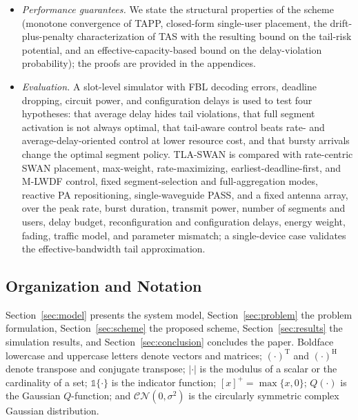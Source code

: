 \documentclass[journal]{IEEEtran}
\begin{document}
\begin{itemize}[leftmargin=*]
\item \emph{Performance guarantees.} We state the structural properties of the scheme (monotone convergence of TAPP, closed-form single-user placement, the drift-plus-penalty characterization of TAS with the resulting bound on the tail-risk potential, and an effective-capacity-based bound on the delay-violation probability); the proofs are provided in the appendices.
\item \emph{Evaluation.} A slot-level simulator with FBL decoding errors, deadline dropping, circuit power, and configuration delays is used to test four hypotheses: that average delay hides tail violations, that full segment activation is not always optimal, that tail-aware control beats rate- and average-delay-oriented control at lower resource cost, and that bursty arrivals change the optimal segment policy. TLA-SWAN is compared with rate-centric SWAN placement, max-weight, rate-maximizing, earliest-deadline-first, and M-LWDF control, fixed segment-selection and full-aggregation modes, reactive PA repositioning, single-waveguide PASS, and a fixed antenna array, over the peak rate, burst duration, transmit power, number of segments and users, delay budget, reconfiguration and configuration delays, energy weight, fading, traffic model, and parameter mismatch; a single-device case validates the effective-bandwidth tail approximation.
\end{itemize}

\subsection{Organization and Notation}
Section~\ref{sec:model} presents the system model, Section~\ref{sec:problem} the problem formulation, Section~\ref{sec:scheme} the proposed scheme, Section~\ref{sec:results} the simulation results, and Section~\ref{sec:conclusion} concludes the paper. Boldface lowercase and uppercase letters denote vectors and matrices; $(\cdot)^{\mathrm T}$ and $(\cdot)^{\mathrm H}$ denote transpose and conjugate transpose; $|\cdot|$ is the modulus of a scalar or the cardinality of a set; $\mathbb 1\{\cdot\}$ is the indicator function; $[x]^+=\max\{x,0\}$; $Q(\cdot)$ is the Gaussian $Q$-function; and $\mathcal{CN}(0,\sigma^2)$ is the circularly symmetric complex Gaussian distribution.

\end{document}
